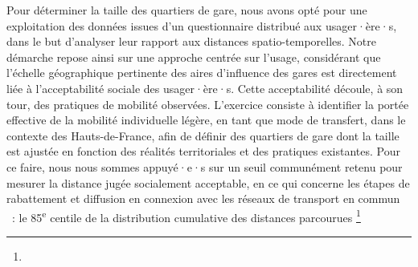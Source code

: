 \begin{refsegment}
Pour déterminer la taille des quartiers de gare, nous avons opté pour une exploitation des données issues d’un questionnaire distribué aux usager·ère·s, dans le but d’analyser leur rapport aux distances spatio-temporelles. Notre démarche repose ainsi sur une approche centrée sur l’usage, considérant que l’échelle géographique pertinente des aires d’influence des gares est directement liée à l’acceptabilité sociale des usager·ère·s. Cette acceptabilité découle, à son tour, des pratiques de mobilité observées. L’exercice consiste à identifier la portée effective de la mobilité individuelle légère, en tant que mode de transfert, dans le contexte des Hauts-de-France, afin de définir des quartiers de gare dont la taille est ajustée en fonction des réalités territoriales et des pratiques existantes. Pour ce faire, nous nous sommes appuyé·e·s sur un seuil communément retenu pour mesurer la distance jugée socialement acceptable, en ce qui concerne les étapes de \gls{rabattement} et \gls{diffusion} en connexion avec les réseaux de transport en commun \textcolor{blue}{\autocite[5]{li_exploring_2021}}~: le 85\textsuperscript{e} centile de la distribution cumulative des distances parcourues \textcolor{blue}{\autocite[982]{lee_bicycle-based_2016}}\footnote{
}
\end{refsegment}
